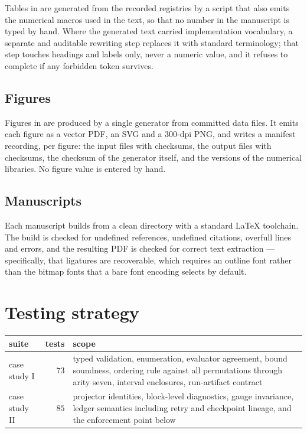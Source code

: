 \documentclass[11pt]{amsart}
\theoremstyle{remark}
\begin{document}
Tables in \cite{ChaveroJassoTrees} are generated from the recorded registries by a script
that also emits the numerical macros used in the text, so that no number in the manuscript
is typed by hand. Where the generated text carried implementation vocabulary, a separate
and auditable rewriting step replaces it with standard terminology; that step touches
headings and labels only, never a numeric value, and it refuses to complete if any
forbidden token survives.

\subsection{Figures}

Figures in \cite{ChaveroJassoSupplement} are produced by a single generator from committed
data files. It emits each figure as a vector PDF, an SVG and a 300-dpi PNG, and writes a
manifest recording, per figure: the input files with checksums, the output files with
checksums, the checksum of the generator itself, and the versions of the numerical
libraries. No figure value is entered by hand.

\subsection{Manuscripts}

Each manuscript builds from a clean directory with a standard \LaTeX{} toolchain. The build
is checked for undefined references, undefined citations, overfull lines and errors, and the
resulting PDF is checked for correct text extraction --- specifically, that ligatures are
recoverable, which requires an outline font rather than the bitmap fonts that a bare
 font encoding selects by default.

\section{Testing strategy}
\label{sec:testing}

\begin{center}
\small
\begin{tabularx}{\linewidth}{@{}lrX@{}}
\toprule
suite & tests & scope \\
\midrule
case study I & $73$ & typed validation, enumeration, evaluator agreement, bound soundness, ordering rule against all permutations through arity seven, interval enclosures, run-artifact contract \\
case study II & $85$ & projector identities, block-level diagnostics, gauge invariance, ledger semantics including retry and checkpoint lineage, and the enforcement point below \\
\bottomrule
\end{tabularx}
\end{center}
\end{document}
